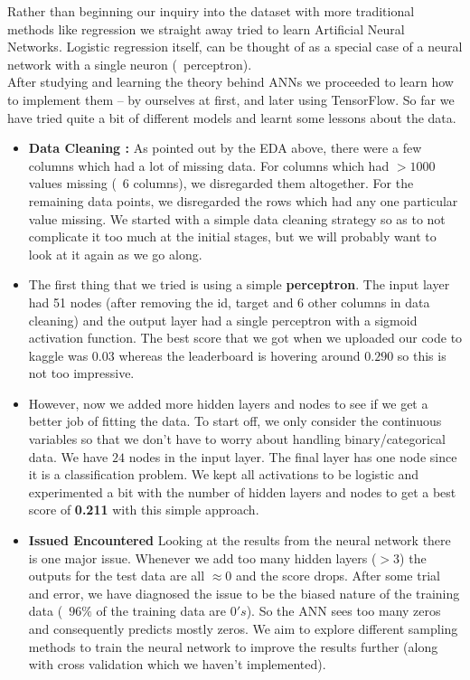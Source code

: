 Rather than beginning our inquiry into the dataset with more traditional methods like regression we straight away tried to learn Artificial Neural Networks. Logistic regression itself, can be thought of as a special case of a neural network with a single neuron (~perceptron). 
\\
After studying and learning the theory behind ANNs we proceeded to learn how to implement them -- by ourselves at first, and later using TensorFlow. So far we have tried quite a bit of different models and learnt some lessons about the data.
\\
\begin{itemize}

\item \textbf{Data Cleaning :} As pointed out by the EDA above, there were a few columns which had a lot of missing data. For columns which had $>1000$ values missing (~6 columns), we disregarded them altogether. For the remaining data points, we disregarded the rows which had any one particular value missing. We started with a simple data cleaning strategy so as to not complicate it too much at the initial stages, but we will probably want to look at it again as we go along.

\item The first thing that we tried is using a simple \textbf{perceptron}. The input layer had 51 nodes (after removing the id, target and 6 other columns in data cleaning) and the output layer had a single perceptron with a sigmoid activation function. The best score that we got when we uploaded our code to kaggle was $0.03$ whereas the leaderboard is hovering around $0.290$ so this is not too impressive.

\item However, now we added more hidden layers and nodes to see if we get a better job of fitting the data. To start off, we only consider the continuous variables so that we don't have to worry about handling binary/categorical data. We have $24$ nodes in the input layer. The final layer has one node  since it is a classification problem. We kept all activations to be logistic and experimented a bit with the number of hidden layers and nodes to get a best score of \textbf{0.211} with this simple approach.

\item \textbf{Issued Encountered}  Looking at the results from the neural network there is one major issue. Whenever we add too many hidden layers ($>3$) the outputs for the test data are all $\approx 0$ and the score drops. After some trial and error, we have diagnosed the issue to be the biased nature of the training data (~$96\%$ of the training data are $0's$). So the ANN sees too many zeros and consequently predicts mostly zeros. We aim to explore different sampling methods to train the neural network to improve the results further (along with cross validation which we haven't implemented).
\end{itemize}


